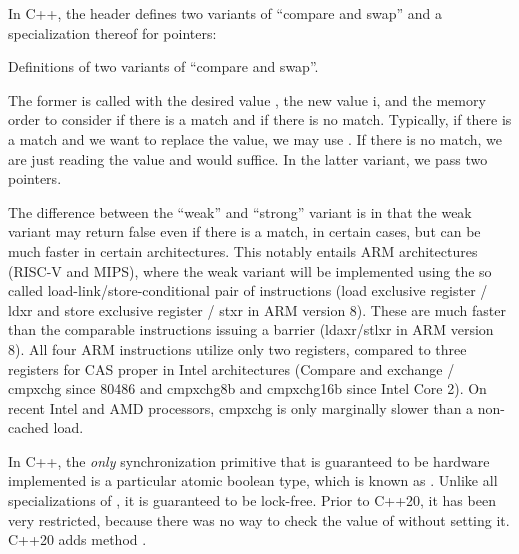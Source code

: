 In C++, the  header defines two variants of ``compare and swap'' and a specialization thereof for pointers:

\raggedbottom
\begin{codebox}[]{\href{https://godbolt.org/z/jGb1PxoxY}{\ExternalLink}}
\footnotesize Definitions of two variants of ``compare and swap''.
\tcblower
{}
\end{codebox}

The former is called with the desired value , the new value {i}, and the memory order to consider if there is a match and if there is no match. Typically, if there is a match and we want to replace the value, we may use . If there is no match, we are just reading the value and  would suffice. In the latter variant, we pass two pointers. 

The difference between the ``weak'' and ``strong'' variant is in that the weak variant may return false even if there is a match, in certain cases, but can be much faster in certain architectures. This notably entails ARM architectures (RISC-V and MIPS), where the weak variant will be implemented using the so called load-link/store-conditional pair of instructions (load exclusive register / ldxr and store exclusive register / stxr in ARM version 8).
These are much faster than the comparable instructions issuing a barrier (ldaxr/stlxr in ARM version 8).
All four ARM instructions utilize only two registers, compared to three registers for CAS proper in Intel architectures (Compare and exchange / cmpxchg since 80486 and cmpxchg8b and cmpxchg16b since Intel Core 2). On recent Intel and AMD processors, cmpxchg is only marginally slower than a non-cached load.

In C++, the \emph{only} synchronization primitive that is guaranteed to be hardware implemented is a particular atomic boolean type, which is known as . Unlike all specializations of , it is guaranteed to be lock-free. Prior to C++20, it has been very restricted, because there was no way to check the value of  without setting it. C++20 adds method . 



